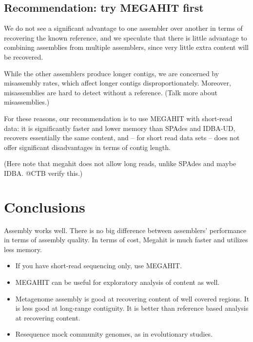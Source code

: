 \documentclass[10pt,a4paper,twocolumn]{article}
\begin{document}
\subsection*{Recommendation: try MEGAHIT first}

We do not see a significant advantage to one assembler over another in
terms of recovering the known reference, and we speculate that there
is little advantage to combining assemblies from multiple assemblers,
since very little extra content will be recovered.

While the other assemblers produce longer contigs, we are concerned by
misassembly rates, which affect longer contigs disproportionately.
Moreover, misassemblies are hard to detect without a reference. 
(Talk
more about misassemblies.)

For these reasons, our recommendation is to use MEGAHIT with
short-read data: it is significantly faster and lower memory than
SPAdes and IDBA-UD, recovers essentially the same content, and -- for
short read data sets -- does not offer significant disadvantages in
terms of contig length.

(Here note that megahit does not allow long reads, unlike SPAdes and maybe
IDBA. @CTB verify this.)

\section*{Conclusions}

Assembly works well. There is no big difference between assemblers'
performance in terms of assembly quality. In terms of cost, Megahit is
much faster and utilizes less memory.

\begin{itemize}
\item If you have short-read sequencing only, use MEGAHIT.
\item MEGAHIT can be useful for exploratory analysis of content as well.
\item Metagenome assembly is good at recovering content of well covered
  regions.  It is less good at long-range contiguity. It is better than
  reference based analysis at recovering content.
\item Resequence mock community genomes, as in evolutionary studies.
\end{itemize}


\end{document}
